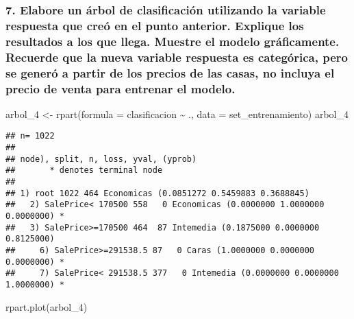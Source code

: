 \documentclass[
]{article}
\newenvironment{Shaded}{\begin{snugshade}}{\end{snugshade}}
\newcommand{\AttributeTok}[1]{\textcolor[rgb]{0.77,0.63,0.00}{#1}}
\newcommand{\FunctionTok}[1]{\textcolor[rgb]{0.00,0.00,0.00}{#1}}
\newcommand{\NormalTok}[1]{#1}
\newcommand{\OtherTok}[1]{\textcolor[rgb]{0.56,0.35,0.01}{#1}}
\newcommand{\SpecialCharTok}[1]{\textcolor[rgb]{0.00,0.00,0.00}{#1}}
\begin{document}
\hypertarget{elabore-un-uxe1rbol-de-clasificaciuxf3n-utilizando-la-variable-respuesta-que-creuxf3-en-el-punto-anterior.-explique-los-resultados-a-los-que-llega.-muestre-el-modelo-gruxe1ficamente.-recuerde-que-la-nueva-variable-respuesta-es-categuxf3rica-pero-se-generuxf3-a-partir-de-los-precios-de-las-casas-no-incluya-el-precio-de-venta-para-entrenar-el-modelo.}{%
\subsubsection{7. Elabore un árbol de clasificación utilizando la
variable respuesta que creó en el punto anterior. Explique los
resultados a los que llega. Muestre el modelo gráficamente. Recuerde que
la nueva variable respuesta es categórica, pero se generó a partir de
los precios de las casas, no incluya el precio de venta para entrenar el
modelo.}\label{elabore-un-uxe1rbol-de-clasificaciuxf3n-utilizando-la-variable-respuesta-que-creuxf3-en-el-punto-anterior.-explique-los-resultados-a-los-que-llega.-muestre-el-modelo-gruxe1ficamente.-recuerde-que-la-nueva-variable-respuesta-es-categuxf3rica-pero-se-generuxf3-a-partir-de-los-precios-de-las-casas-no-incluya-el-precio-de-venta-para-entrenar-el-modelo.}}

\begin{Shaded}
\begin{Highlighting}[]
\NormalTok{arbol\_4 }\OtherTok{\textless{}{-}} \FunctionTok{rpart}\NormalTok{(}\AttributeTok{formula =}\NormalTok{ clasificacion }\SpecialCharTok{\textasciitilde{}}\NormalTok{ ., }\AttributeTok{data =}\NormalTok{ set\_entrenamiento)}
\NormalTok{arbol\_4}
\end{Highlighting}
\end{Shaded}

\begin{verbatim}
## n= 1022 
## 
## node), split, n, loss, yval, (yprob)
##       * denotes terminal node
## 
## 1) root 1022 464 Economicas (0.0851272 0.5459883 0.3688845)  
##   2) SalePrice< 170500 558   0 Economicas (0.0000000 1.0000000 0.0000000) *
##   3) SalePrice>=170500 464  87 Intemedia (0.1875000 0.0000000 0.8125000)  
##     6) SalePrice>=291538.5 87   0 Caras (1.0000000 0.0000000 0.0000000) *
##     7) SalePrice< 291538.5 377   0 Intemedia (0.0000000 0.0000000 1.0000000) *
\end{verbatim}

\begin{Shaded}
\begin{Highlighting}[]
\FunctionTok{rpart.plot}\NormalTok{(arbol\_4)}
\end{Highlighting}
\end{Shaded}
\end{document}
